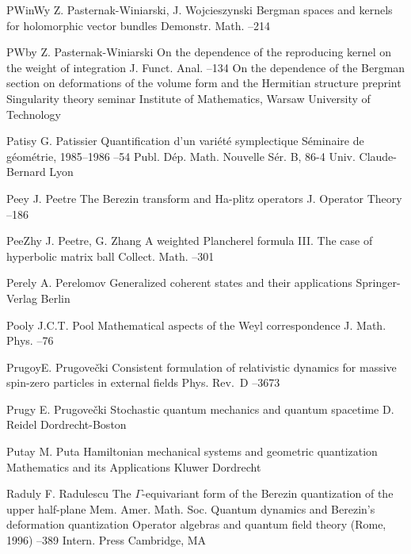 \documentclass[11pt]{amsart}
\numberwithin{equation}{section}
\theoremstyle{remark}
\newcommand{\by}{\mathbf y}
\begin{document}
\begin{thebibliography}{199}
 PWinW\by{ Z. Pasternak-Winiarski, J. Wojcieszynski \paper Bergman
spaces and kernels for holomorphic vector bundles \jour Demonstr. Math.
  --214}

 PWb\by{ Z. Pasternak-Winiarski \paper On the dependence of the
reproducing kernel on the weight of integration \jour J. Funct. Anal. 
 --134  \moreref \paper On the dependence of the Bergman
section on deformations of the volume form and the Hermitian structure
\paperinfo preprint \inbook Singularity theory seminar \publ Institute of
Mathematics, Warsaw University of Technology }

 Patis\by{ G. Patissier \paper Quantification d'un vari\'et\'e
symplectique \inbook S\'eminaire de g\'eom\'etrie, 1985--1986 --54
\bookinfo Publ. D\'ep. Math. Nouvelle S\'er. B, 86-4 \publ Univ. Claude-Bernard
\publaddr Lyon }

 Pee\by{ J. Peetre \paper The Berezin transform and Ha-plitz operators
\jour J. Operator Theory   --186}

 PeeZh\by{ J. Peetre, G. Zhang \paper A weighted Plancherel formula III.
The case of hyperbolic matrix ball \jour Collect. Math.  
--301}

 Perel\by{ A. Perelomov \book Generalized coherent states and their
applications \publ Springer-Verlag \publaddr Berlin }

 Pool\by{ J.C.T. Pool \paper Mathematical aspects of the Weyl
correspondence \jour J. Math. Phys.   --76}

 Prugo\by{E. Prugove\v cki \paper Consistent formulation of relativistic
dynamics for massive spin-zero particles in external fields \jour Phys. Rev.~D
  --3673}

 Prug\by{ E. Prugove\v cki \book Stochastic quantum mechanics and quantum
spacetime \publ D. Reidel \publaddr Dordrecht-Boston }

 Puta\by{ M. Puta \book Hamiltonian mechanical systems and geometric
quantization \bookinfo Mathematics and its Applications  \publ
Kluwer \publaddr Dordrecht }

 Radul\by{ F. Radulescu \paper The $\Gamma$-equivariant form of the
Berezin quantization of the upper half-plane \jour Mem. Amer. Math. Soc.    \moreref \paper Quantum dynamics and Berezin's
deformation quantization \inbook Operator algebras and quantum field theory
(Rome, 1996) --389 \publ Intern. Press \publaddr Cambridge, MA }


\end{thebibliography}
\end{document}
